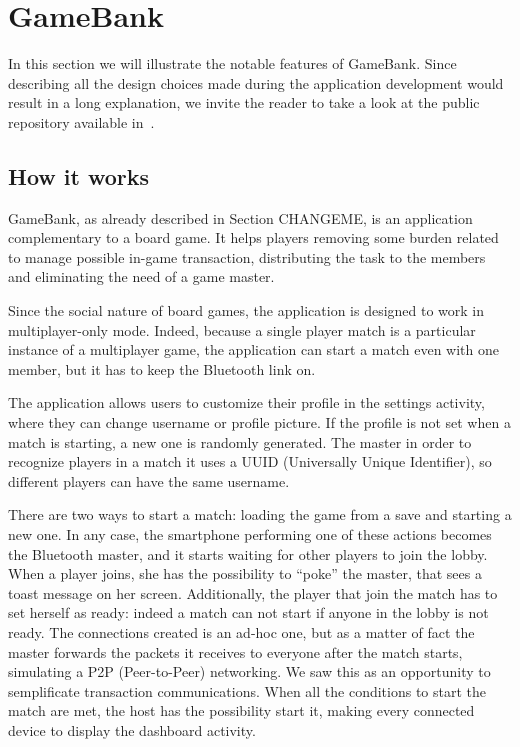 \section{GameBank}

In this section we will illustrate the notable features of GameBank. Since 
describing all the design choices made during the application development would 
result in a long explanation, we invite the reader to take a look at the public 
repository available in~\cite{gamebank18}.

\subsection{How it works}

GameBank, as already described in Section CHANGEME,  is an application complementary to a board game. It helps players 
removing some burden related to manage possible in-game transaction, 
distributing the task to the members and eliminating the need of a game master.

Since the social nature of board games, the application is designed to work 
in multiplayer-only mode. Indeed, because a single player match is a particular 
instance of a multiplayer game, the application can start a match even with one 
member, but it has to keep the Bluetooth link on.

The application allows users to customize their profile in the settings 
activity, where they can change username or profile picture. If the profile is 
not set when a match is starting, a new one is randomly generated. The master 
in order to recognize players in a match it uses a UUID (Universally Unique 
Identifier), so different players can have the same username.

There are two ways to start a match: loading the game from a save and starting 
a new one. In any case, the smartphone performing one of these actions becomes 
the Bluetooth master, and it starts waiting for other players to join the 
lobby. When a player joins, she has the possibility to ``poke'' the master, 
that sees a toast message on her screen. Additionally, the player that join the 
match has to set herself as ready: indeed a match can not start if anyone in the 
lobby is not ready. 
The connections created is an ad-hoc one, but as a matter of fact the master 
forwards the packets it receives to everyone after the match starts, simulating 
a P2P (Peer-to-Peer) networking. We saw this as an opportunity to semplificate 
transaction communications.
When all the conditions to start the match are met, the host has the 
possibility start it, making every connected device to display the dashboard 
activity.

